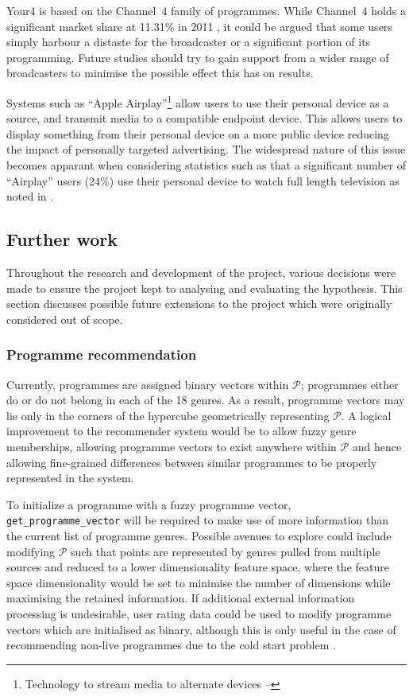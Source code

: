 	Your4 is based on the Channel~4 family of programmes. While Channel~4 holds a significant market share at 11.31\% in 2011 \citep{barb-trends}, it could be argued that some users simply harbour a distaste for the broadcaster or a significant portion of its programming. Future studies should try to gain support from a wider range of broadcasters to minimise the possible effect this has on results.

	Systems such as ``Apple Airplay''\footnote{Technology to stream media to alternate devices -- } allow users to use their personal device as a source, and transmit media to a compatible endpoint device. This allows users to display something from their personal device on a more public device reducing the impact of personally targeted advertising. The widespread nature of this issue becomes apparant when considering statistics such as that a significant number of ``Airplay'' users (24\%) use their personal device to watch full length television as noted in \citet{viacom}.

	\subsection{Further work}
		Throughout the research and development of the project, various decisions were made to ensure the project kept to analysing and evaluating the hypothesis. This section discusses possible future extensions to the project which were originally considered out of scope.

		\subsubsection{Programme recommendation}
		\label{sec:further_work_recommender}

		Currently, programmes are assigned binary vectors within $\mathcal{P}$; programmes either do or do not belong in each of the 18 genres. As a result, programme vectors may lie only in the corners of the hypercube geometrically representing $\mathcal{P}$. A logical improvement to the recommender system would be to allow fuzzy genre memberships, allowing programme vectors to exist anywhere within $\mathcal{P}$ and hence allowing fine-grained differences between similar programmes to be properly represented in the system.
		
		To initialize a programme with a fuzzy programme vector, \texttt{get\_programme\_vector} will be required to make use of more information than the current list of programme genres. Possible avenues to explore could include modifying $\mathcal{P}$ such that points are represented by genres pulled from multiple sources and reduced to a lower dimensionality feature space, where the feature space dimensionality would be set to minimise the number of dimensions while maximising the retained information. If additional external information processing is undesirable, user rating data could be used to modify programme vectors which are initialised as binary, although this is only useful in the case of recommending non-live programmes due to the cold start problem \citep{cold-start-problem}.

